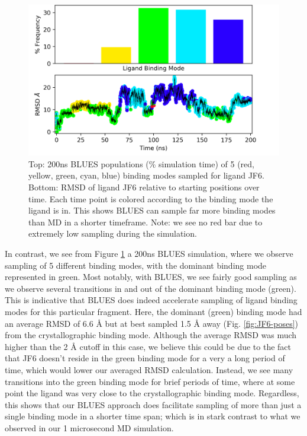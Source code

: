 \begin{figure}
    \centering
    \includegraphics[width=\linewidth]{chapter6/Figures/JF6_c4-14607404.png}
    \caption[JF6 BLUES Populations]{Top: 200ns BLUES populations (\% simulation time) of 5 (red, yellow, green, cyan, blue) binding modes sampled for ligand JF6. Bottom: RMSD of ligand JF6 relative to starting positions over time. Each time point is colored according to the binding mode the ligand is in. This shows BLUES can sample far more binding modes than MD in a shorter timeframe. Note: we see no red bar due to extremely low sampling during the simulation.}
    \label{fig:JF6_c4-blues}
\end{figure}

In contrast, we see from Figure \ref{fig:JF6_c4-blues} a 200ns BLUES simulation, where we observe sampling of 5 different binding modes, with the dominant binding mode represented in green.
Most notably, with BLUES, we see fairly good sampling as we observe several transitions in and out of the dominant binding mode (green).
This is indicative that BLUES does indeed accelerate sampling of ligand binding modes for this particular fragment.
Here, the dominant (green) binding mode had an average RMSD of 6.6 {\AA} but at best sampled 1.5 {\AA} away (Fig. \ref{fig:JF6-poses}) from the crystallographic binding mode.
Although the average RMSD was much higher than the 2 {\AA} cutoff in this case, we believe this could be due to the fact that JF6 doesn't reside in the green binding mode for a very a long period of time, which would lower our averaged RMSD calculation.
Instead, we see many transitions into the green binding mode for brief periods of time, where at some point the ligand was very close to the crystallographic binding mode.
Regardless, this shows that our BLUES approach does facilitate sampling of more than just a single binding mode in a shorter time span; which is in stark contrast to what we observed in our 1 microsecond MD simulation.


